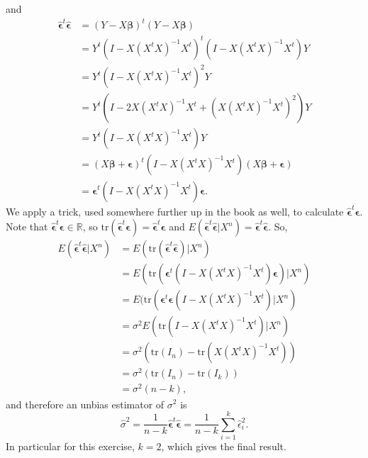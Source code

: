 and
\begin{equation*}
    \begin{split}
        \hat{\bm{\epsilon}}^t\hat{\bm{\epsilon}}
            &= (Y - X\bm{\beta})^t(Y - X\bm{\beta}) \\
            &= Y^t (I - X(X^tX)^{-1}X^t)^t (I - X(X^tX)^{-1}X^t) Y \\
            &= Y^t (I - X(X^tX)^{-1}X^t)^2 Y \\
            &= Y^t (I - 2X(X^tX)^{-1}X^t + (X(X^tX)^{-1}X^t)^2) Y \\
            &= Y^t (I - X(X^tX)^{-1}X^t) Y \\
            &= (X\bm{\beta} + \bm{\epsilon})^t (I - X(X^tX)^{-1}X^t) (X\bm{\beta} + \bm{\epsilon}) \\
            &= \bm{\epsilon}^t (I - X(X^tX)^{-1}X^t) \bm{\epsilon}.
    \end{split}
\end{equation*}
We apply a trick, used somewhere further up in the book as well, to calculate $\hat{\bm{\epsilon}}^t\bm{\epsilon}$.
Note that $\hat{\bm{\epsilon}}^t\bm{\epsilon} \in \mathbb{R}$, so $\mathrm{tr}(\hat{\bm{\epsilon}}^t\bm{\epsilon}) = \hat{\bm{\epsilon}}^t\bm{\epsilon}$ and $E(\hat{\bm{\epsilon}}^t\hat{\bm{\epsilon}}|X^n) = \hat{\bm{\epsilon}}^t\hat{\bm{\epsilon}}$.
So,
\begin{equation*}
    \begin{split}
        E(\hat{\bm{\epsilon}}^t\hat{\bm{\epsilon}}|X^n)
            &= E(\mathrm{tr}(\hat{\bm{\epsilon}}^t\hat{\bm{\epsilon}})|X^n) \\
            &= E(\mathrm{tr}(\bm{\epsilon}^t(I - X(X^tX)^{-1}X^t)\bm{\epsilon})|X^n) \\
            &= E(\mathrm{tr}(\bm{\epsilon}^t\bm{\epsilon}(I - X(X^tX)^{-1}X^t)|X^n) \\
            &= \sigma^2 E(\mathrm{tr}(I - X(X^tX)^{-1}X^t)|X^n) \\
            &= \sigma^2 (\mathrm{tr}(I_n) - \mathrm{tr}(X(X^tX)^{-1}X^t)) \\
            &= \sigma^2 (\mathrm{tr}(I_n) - \mathrm{tr}(I_k)) \\
            &= \sigma^2 (n - k),
    \end{split}
\end{equation*}
and therefore an unbias estimator of $\sigma^2$ is
\begin{equation*}
    \hat{\sigma}^2 = \frac{1}{n - k} \bm{\hat{\epsilon}}^t \bm{\hat{\epsilon}}
        = \frac{1}{n - k} \sum_{i = 1}^k \hat{\epsilon}_i^2.
\end{equation*}
In particular for this exercise, $k = 2$, which gives the final result.
